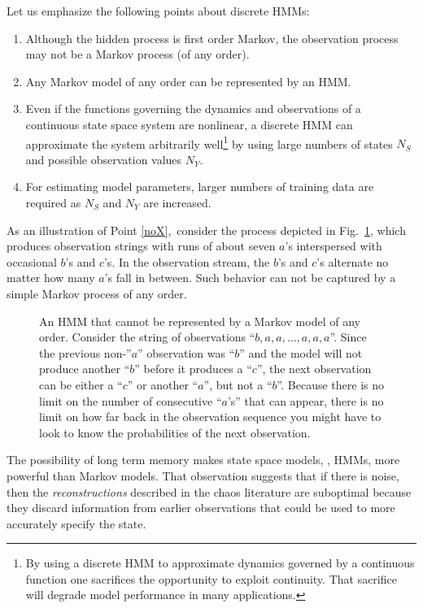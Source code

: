 Let us emphasize the following points about discrete HMMs:
\begin{enumerate}
\item Although the hidden process is first order Markov, the observation
process may not be a Markov process (of any order). \label{noX}
\item Any Markov model of any order can be represented by an HMM.
\item Even if the functions governing the dynamics and observations of
  a continuous state space system are nonlinear, a discrete HMM can
  approximate the system arbitrarily well\footnote{By using a discrete
    HMM to approximate dynamics governed by a continuous function one
    sacrifices the opportunity to exploit continuity.  That sacrifice
    will degrade model performance in many applications.} by
  using large numbers of states $N_S$ and possible observation values
  $N_Y$.
\item For estimating model parameters, larger numbers of training data
  are required as $N_S$ and $N_Y$ are increased. \label{point:large}
\end{enumerate}

As an illustration of Point \ref{noX},\ consider the process depicted in
Fig.~\ref{fig:nonmm}, which produces observation strings with runs of about
seven $a$'s interspersed with occasional $b$'s and $c$'s.  In the
observation stream, the $b$'s and $c$'s alternate no matter how many $a$'s
fall in between.  Such behavior can not be captured by a simple Markov
process of any order.

\begin{figure}[htbp]
  \centering{\plotsize%
    }
  \caption[An HMM that cannot be represented by a Markov model.]%
  {An HMM that cannot be represented by a Markov model of any order.
    Consider the string of observations ``$b,a,a,\ldots,a,a,a$''.
    Since the previous non-''$a$'' observation was ``$b$'' and the
    model will not produce another ``$b$'' before it produces a
    ``$c$'', the next observation can be either a ``$c$'' or another
    ``$a$'', but not a ``$b$''.  Because there is no limit on the
    number of consecutive ``$a$'s'' that can appear, there is no limit
    on how far back in the observation sequence you might have to look
    to know the probabilities of the next observation.}
  \label{fig:nonmm}
\end{figure}

The possibility of long term memory makes state space models, \eg,
HMMs, more powerful than Markov models.  That observation suggests
that if there is noise, then the \emph{ reconstructions}
described in the chaos
literature\cite{Packard80,Takens81,Fraser86,Sauer91} are suboptimal
because they discard information from earlier observations that could
be used to more accurately specify the state.

